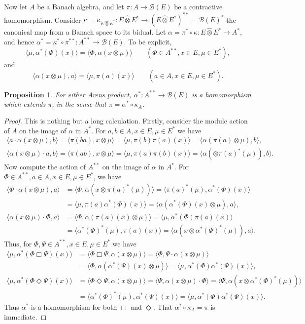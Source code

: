 \documentclass[a4paper,12pt]{article}
\theoremstyle{plain}
\newtheorem{proposition}{Proposition}[section]
\theoremstyle{definition}
\newcommand{\mc}{\mathcal}
\newcommand{\ip}[2]{\langle{#1},{#2}\rangle}
\newcommand{\proten}{\widehat\otimes}
\newcommand{\aone}{\Box}
\newcommand{\atwo}{\Diamond}
\begin{document}
Now let $A$ be a Banach algebra, and let $\pi:A\rightarrow\mc B(E)$ be a contractive
homomorphism.  Consider $\kappa = \kappa_{E\proten E^*} : E\proten E^* \rightarrow
(E\proten E^*)^{**} = \mc B(E)^*$ the canonical map from a Banach space to its bidual.
Let $\alpha = \pi^* \circ \kappa : E\proten E^* \rightarrow A^*$, and hence
$\alpha^* = \kappa^* \circ \pi^{**} : A^{**} \rightarrow\mc B(E)$.  To be explicit,
\[ \ip{\mu}{\alpha^*(\Phi)(x)} = \ip{\Phi}{\alpha(x\otimes\mu)}
\qquad (\Phi\in A^{**}, x\in E, \mu\in E^*), \]
and
\[ \ip{\alpha(x\otimes\mu)}{a} = \ip{\mu}{\pi(a)(x)}
\qquad (a\in A, x\in E, \mu\in E^*). \]

\begin{proposition}\label{prop:two}
For either Arens product, $\alpha^*:A^{**} \rightarrow\mc B(E)$ is a homomorphism
which extends $\pi$, in the sense that $\pi = \alpha^* \circ \kappa_A$.
\end{proposition}
\begin{proof}
This is nothing but a long calculation.  Firstly, consider the module action of
$A$ on the image of $\alpha$ in $A^*$.  For $a,b\in A, x\in E, \mu\in E^*$ we have
\begin{align*}
\ip{a\cdot\alpha(x\otimes\mu)}{b} = \ip{\pi(ba)}{x\otimes\mu}
= \ip{\mu}{\pi(b)\pi(a)(x)} = \ip{\alpha(\pi(a)\otimes\mu)}{b}, \\
\ip{\alpha(x\otimes\mu)\cdot a}{b} = \ip{\pi(ab)}{x\otimes\mu}
= \ip{\mu}{\pi(a)\pi(b)(x)} = \ip{\alpha(\otimes\pi(a)^*(\mu))}{b}.
\end{align*}
Now compute the action of $A^{**}$ on the image of $\alpha$ in $A^*$.
For $\Phi\in A^{**}, a\in A,x\in E,\mu\in E^*$, we have
\begin{align*}
\ip{\Phi\cdot\alpha(x\otimes\mu)}{a} &= \ip{\Phi}{\alpha(x\otimes\pi(a)^*(\mu))}
= \ip{\pi(a)^*(\mu)}{\alpha^*(\Phi)(x)} \\
&= \ip{\mu}{\pi(a) \alpha^*(\Phi)(x)}
= \ip{\alpha(\alpha^*(\Phi)(x)\otimes\mu)}{a}, \\
\ip{\alpha(x\otimes\mu)\cdot\Phi}{a} &= \ip{\Phi}{\alpha(\pi(a)(x)\otimes\mu)}
= \ip{\mu}{\alpha^*(\Phi) \pi(a)(x)} \\
&= \ip{\alpha^*(\Phi)^*(\mu)}{\pi(a)(x)}
= \ip{\alpha(x\otimes\alpha^*(\Phi)^*(\mu))}{a}.
\end{align*}
Thus, for $\Phi,\Psi\in A^{**},x\in E,\mu\in E^*$ we have
\begin{align*}
\ip{\mu}{\alpha^*(\Phi\aone\Psi)(x)} &=
  \ip{\Phi\aone\Psi}{\alpha(x\otimes\mu)} =
  \ip{\Phi}{\Psi\cdot\alpha(x\otimes\mu)} \\
  &= \ip{\Phi}{\alpha(\alpha^*(\Psi)(x)\otimes\mu)}
  = \ip{\mu}{\alpha^*(\Phi)\alpha^*(\Psi)(x)}, \\
\ip{\mu}{\alpha^*(\Phi\atwo\Psi)(x)} &=
  \ip{\Phi\atwo\Psi}{\alpha(x\otimes\mu)} =
  \ip{\Psi}{\alpha(x\otimes\mu)\cdot\Phi}
  = \ip{\Psi}{\alpha(x\otimes\alpha^*(\Phi)^*(\mu))} \\
  &= \ip{\alpha^*(\Phi)^*(\mu)}{\alpha^*(\Psi)(x)}
  = \ip{\mu}{\alpha^*(\Phi)\alpha^*(\Psi)(x)}.
\end{align*}
Thus $\alpha^*$ is a homomorphism for both $\aone$ and $\atwo$.  That $\alpha^*\circ
\kappa_A = \pi$ is immediate.
\end{proof}
\end{document}
